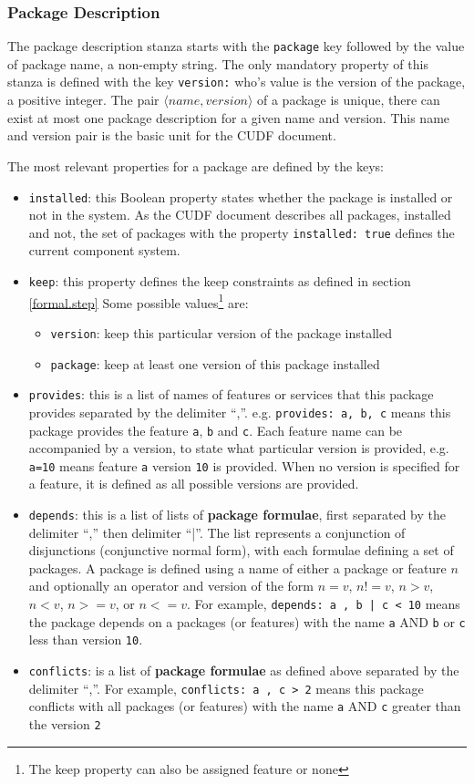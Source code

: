 \subsubsection{Package Description}
The package description stanza starts with the \verb+package+ key followed by the value of package name, a non-empty string.
The only mandatory property of this stanza is defined with the key \verb+version:+ who's value is the version of the package, a positive integer.
The pair $\langle name, version \rangle$ of a package is unique, there can exist at most one package description for a given name and version.
This name and version pair is the basic unit for the CUDF document. 

The most relevant properties for a package are defined by the keys:
\begin{itemize}
  \item \verb+installed+: this Boolean property states whether the package is installed or not in the system. 
  As the CUDF document describes all packages, installed and not, the set of packages with the property \verb+installed: true+ defines the current component system.
  \item \verb+keep+: this property defines the keep constraints as defined in section \ref{formal.step}
  Some possible values\footnote{The keep property can also be assigned feature or none} are:
	  	\begin{itemize}
	  		\item \verb+version+: keep this particular version of the package installed
	  		\item \verb+package+: keep at least one version of this package installed
		\end{itemize}
  \item \verb+provides+: this is a list of names of features or services that this package provides separated by the delimiter ``,''.
  e.g. \verb+provides: a, b, c+ means this package provides the feature \verb+a+, \verb+b+ and \verb+c+.
  Each feature name can be accompanied by a version, to state what particular version is provided, e.g. \verb+a=10+ means feature \verb+a+ version \verb+10+ is provided.
  When no version is specified for a feature, it is defined as all possible versions are provided.
  \item \verb+depends+: this is a list of lists of \textbf{package formulae}, first separated by the delimiter ``,'' then delimiter ``|''.
  The list represents a conjunction of disjunctions (conjunctive normal form), with each formulae defining a set of packages.
  A package is defined using a name of either a package or feature $n$ and optionally an operator and version of the form  $n = v$, $n != v$, $n > v$, $n < v$, $n >= v$, or $n <= v$.
  For example, \verb+depends: a , b | c < 10+ means the package depends on a packages (or features) with the name \verb+a+ AND \verb+b+ or \verb+c+ less than version \verb+10+.  
  \item \verb+conflicts+: is a list of \textbf{package formulae} as defined above separated by the delimiter ``,''.
  For example, \verb+conflicts: a , c > 2+ means this package conflicts with all packages (or features) with the name \verb+a+ AND \verb+c+ greater than the version \verb+2+
\end{itemize}

